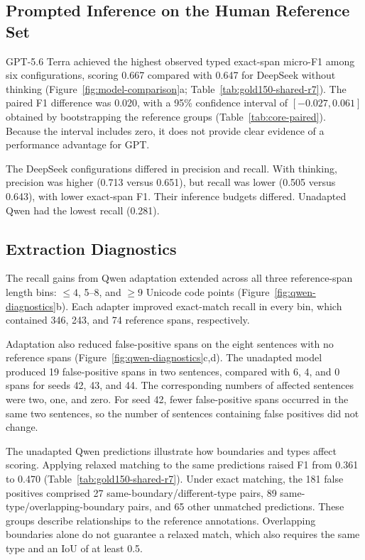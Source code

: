 

\subsection{Prompted Inference on the Human Reference Set}

GPT-5.6 Terra achieved the highest observed typed exact-span micro-F1 among six configurations, scoring 0.667 compared with 0.647 for DeepSeek without thinking (Figure~\ref{fig:model-comparison}a; Table~\ref{tab:gold150-shared-r7}). The paired F1 difference was 0.020, with a 95\% confidence interval of $[-0.027, 0.061]$ obtained by bootstrapping the reference groups (Table~\ref{tab:core-paired}). Because the interval includes zero, it does not provide clear evidence of a performance advantage for GPT.

The DeepSeek configurations differed in precision and recall. With thinking, precision was higher (0.713 versus 0.651), but recall was lower (0.505 versus 0.643), with lower exact-span F1. Their inference budgets differed. Unadapted Qwen had the lowest recall (0.281).







\subsection{Extraction Diagnostics}
\label{sec:extraction-diagnostics}

The recall gains from Qwen adaptation extended across all three reference-span length bins: $\leq4$, 5--8, and $\geq9$ Unicode code points (Figure~\ref{fig:qwen-diagnostics}b). Each adapter improved exact-match recall in every bin, which contained 346, 243, and 74 reference spans, respectively.

Adaptation also reduced false-positive spans on the eight sentences with no reference spans (Figure~\ref{fig:qwen-diagnostics}c,d). The unadapted model produced 19 false-positive spans in two sentences, compared with 6, 4, and 0 spans for seeds 42, 43, and 44. The corresponding numbers of affected sentences were two, one, and zero. For seed 42, fewer false-positive spans occurred in the same two sentences, so the number of sentences containing false positives did not change.

The unadapted Qwen predictions illustrate how boundaries and types affect scoring. Applying relaxed matching to the same predictions raised F1 from 0.361 to 0.470 (Table~\ref{tab:gold150-shared-r7}). Under exact matching, the 181 false positives comprised 27 same-boundary/different-type pairs, 89 same-type/overlapping-boundary pairs, and 65 other unmatched predictions. These groups describe relationships to the reference annotations. Overlapping boundaries alone do not guarantee a relaxed match, which also requires the same type and an IoU of at least 0.5.

